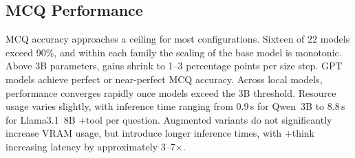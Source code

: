 \documentclass[conference]{IEEEtran}
\begin{document}
\subsection{MCQ Performance}

MCQ accuracy approaches a ceiling for most configurations. Sixteen of 22 models exceed 90\%, and within each family the scaling of the base model is monotonic. Above 3B parameters, gains shrink to 1--3 percentage points per size step. GPT models achieve perfect or near-perfect MCQ accuracy. Across local models, performance converges rapidly once models exceed the 3B threshold. Resource usage varies slightly, with inference time ranging from 0.9\,s for Qwen~3B to 8.8\,s for Llama3.1~8B +tool per question. Augmented variants do not significantly increase VRAM usage, but introduce longer inference times, with +think increasing latency by approximately 3--7$\times$.
\end{document}
